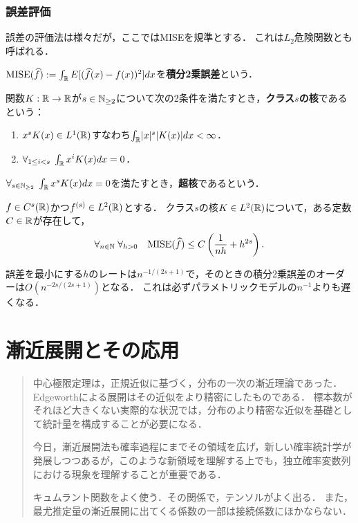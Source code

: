 \documentclass[uplatex,dvipdfmx]{jsreport}
\begin{document}
\subsection{誤差評価}

\begin{tcolorbox}[colframe=ForestGreen, colback=ForestGreen!10!white,breakable,colbacktitle=ForestGreen!40!white,coltitle=black,fonttitle=\bfseries\sffamily,
title=]
    誤差の評価法は様々だが，ここではMISEを規準とする．
    これは$L_2$危険関数とも呼ばれる．
\end{tcolorbox}

\begin{definition}
    $\mathrm{MISE}(\widehat{f}):=\int_{\mathbb{R}} E[(\widehat{f}(x)-f(x))^2]dx$を\textbf{積分2乗誤差}という．
\end{definition}

\begin{definition}
    関数$K:\mathbb{R}\to\mathbb{R}$が$s\in\mathbb{N}_{\ge2}$について次の2条件を満たすとき，\textbf{クラス$s$の核}であるという：
    \begin{enumerate}
        \item $x^sK(x)\in L^1(\mathbb{R})$すなわち$\int_{\mathbb{R}}\lvert x\rvert^s\lvert K(x)\rvert dx<\infty$．
        \item $\forall_{1\le i<s}\;\int_{\mathbb{R}} x^iK(x)dx=0$．
    \end{enumerate}
    $\forall_{s\in\mathbb{N}_{\ge2}}\;\int_{\mathbb{R}} x^sK(x)dx=0$を満たすとき，\textbf{超核}であるという．
\end{definition}

\begin{theorem}
    $f\in C^s(\mathbb{R})$かつ$f^{(s)}\in L^2(\mathbb{R})$とする．
    クラス$s$の核$K\in L^2(\mathbb{R})$について，ある定数$C\in\mathbb{R}$が存在して，
    \[\forall_{n\in\mathbb{N}}\;\forall_{h>0}\quad\mathrm{MISE}(\widehat{f})\le C\left(\frac{1}{nh}+h^{2s}\right).\]
\end{theorem}
\begin{remarks}
    誤差を最小にする$h$のレートは$n^{-1/(2s+1)}$で，そのときの積分2乗誤差のオーダーは$O(n^{-2s/(2s+1)})$となる．
    これは必ずパラメトリックモデルの$n^{-1}$よりも遅くなる．
\end{remarks}



\chapter{漸近展開とその応用}

\begin{quotation}
    中心極限定理は，正規近似に基づく，分布の一次の漸近理論であった．
    Edgeworthによる展開はその近似をより精密にしたものである．
    標本数がそれほど大きくない実際的な状況では，分布のより精密な近似を基礎として統計量を構成することが必要になる．

    今日，漸近展開法も確率過程にまでその領域を広げ，新しい確率統計学が発展しつつあるが，このような新領域を理解する上でも，独立確率変数列における現象を理解することが重要である．

    キュムラント関数をよく使う．その関係で，テンソルがよく出る．
    また，最尤推定量の漸近展開に出てくる係数の一部は接続係数にほかならない．
\end{quotation}
\end{document}
